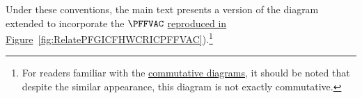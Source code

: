 \documentclass[\econtexRoot/BufferStockTheory]{subfiles}
\begin{document}

Under these conventions, the main text presents a version of the diagram extended to incorporate the $\PFFVAC$ \href{https://econ-ark.github.io/BufferStockTheory/#RelatePFGICFHWCRICPFFVAC}{reproduced in Figure}~\ref{fig:RelatePFGICFHWCRICPFFVAC}).\footnote{For readers familiar with the \href{https://en.wikipedia.org/wiki/Commutative_diagram}{commutative diagrams}, it should be noted that despite the similar appearance, this diagram is not exactly commutative.}%
\end{document}
